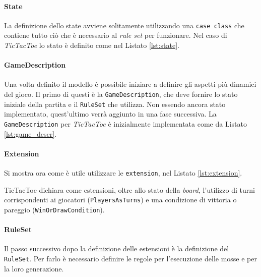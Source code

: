\paragraph{State}
%
La definizione dello state avviene solitamente utilizzando una \texttt{case class} che contiene tutto ciò che è necessario al \textit{rule set} per funzionare.
%
Nel caso di \textit{TicTacToe} lo stato è definito come nel Listato \ref{lst:state}.
%


\paragraph{GameDescription}
%
Una volta definito il modello è possibile iniziare a definire gli aspetti più dinamici del gioco.
%
Il primo di questi è la \texttt{GameDescription}, che deve fornire lo stato iniziale della partita e il \texttt{RuleSet} che utilizza.
%
Non essendo ancora stato implementato, quest'ultimo verrà aggiunto in una fase successiva.
%
La \texttt{GameDescription} per \textit{TicTacToe} è inizialmente implementata come da Listato \ref{lst:game_descr}.
%


\paragraph{Extension}
%
Si mostra ora come è utile utilizzare le \texttt{extension}, nel Listato \ref{lst:extension}.
%

%
TicTacToe dichiara come estensioni, oltre allo stato della \textit{board}, l'utilizzo di turni corrispondenti ai giocatori (\texttt{PlayersAsTurns}) e una condizione di vittoria o pareggio (\texttt{WinOrDrawCondition}).

\paragraph{RuleSet}
Il passo successivo dopo la definizione delle estensioni è la definizione del \texttt{RuleSet}.
%
Per farlo è necessario definire le regole per l'esecuzione delle mosse e per la loro generazione.

